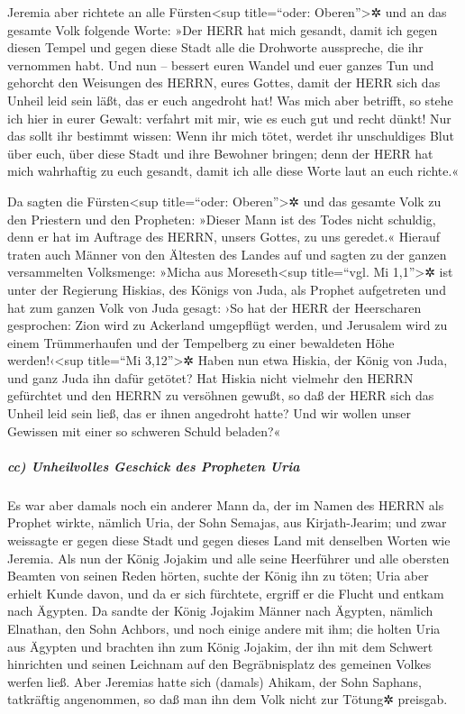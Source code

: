 Jeremia aber richtete an alle Fürsten\textless sup
title=``oder: Oberen''\textgreater✲ und an das gesamte Volk folgende
Worte: »Der HERR hat mich gesandt, damit ich gegen diesen Tempel und
gegen diese Stadt alle die Drohworte ausspreche, die ihr vernommen habt.
Und nun -- bessert euren Wandel und euer ganzes Tun und
gehorcht den Weisungen des HERRN, eures Gottes, damit der HERR sich das
Unheil leid sein läßt, das er euch angedroht hat! Was
mich aber betrifft, so stehe ich hier in eurer Gewalt: verfahrt mit mir,
wie es euch gut und recht dünkt! Nur das sollt ihr
bestimmt wissen: Wenn ihr mich tötet, werdet ihr unschuldiges Blut über
euch, über diese Stadt und ihre Bewohner bringen; denn der HERR hat mich
wahrhaftig zu euch gesandt, damit ich alle diese Worte laut an euch
richte.«

Da sagten die Fürsten\textless sup title=``oder:
Oberen''\textgreater✲ und das gesamte Volk zu den Priestern und den
Propheten: »Dieser Mann ist des Todes nicht schuldig, denn er hat im
Auftrage des HERRN, unsers Gottes, zu uns geredet.«
Hierauf traten auch Männer von den Ältesten des Landes
auf und sagten zu der ganzen versammelten Volksmenge:
»Micha aus Moreseth\textless sup title=``vgl. Mi
1,1''\textgreater✲ ist unter der Regierung Hiskias, des Königs von Juda,
als Prophet aufgetreten und hat zum ganzen Volk von Juda gesagt: ›So hat
der HERR der Heerscharen gesprochen: Zion wird zu Ackerland umgepflügt
werden, und Jerusalem wird zu einem Trümmerhaufen und der Tempelberg zu
einer bewaldeten Höhe werden!‹\textless sup title=``Mi
3,12''\textgreater✲ Haben nun etwa Hiskia, der König von
Juda, und ganz Juda ihn dafür getötet? Hat Hiskia nicht vielmehr den
HERRN gefürchtet und den HERRN zu versöhnen gewußt, so daß der HERR sich
das Unheil leid sein ließ, das er ihnen angedroht hatte? Und wir wollen
unser Gewissen mit einer so schweren Schuld beladen?«

\hypertarget{cc-unheilvolles-geschick-des-propheten-uria}{%
\subparagraph{cc) Unheilvolles Geschick des Propheten
Uria}\label{cc-unheilvolles-geschick-des-propheten-uria}}

Es war aber damals noch ein anderer Mann da, der im Namen
des HERRN als Prophet wirkte, nämlich Uria, der Sohn Semajas, aus
Kirjath-Jearim; und zwar weissagte er gegen diese Stadt und gegen dieses
Land mit denselben Worten wie Jeremia. Als nun der König
Jojakim und alle seine Heerführer und alle obersten Beamten von seinen
Reden hörten, suchte der König ihn zu töten; Uria aber erhielt Kunde
davon, und da er sich fürchtete, ergriff er die Flucht und entkam nach
Ägypten. Da sandte der König Jojakim Männer nach Ägypten,
nämlich Elnathan, den Sohn Achbors, und noch einige andere mit ihm;
die holten Uria aus Ägypten und brachten ihn zum König
Jojakim, der ihn mit dem Schwert hinrichten und seinen Leichnam auf den
Begräbnisplatz des gemeinen Volkes werfen ließ. Aber
Jeremias hatte sich (damals) Ahikam, der Sohn Saphans, tatkräftig
angenommen, so daß man ihn dem Volk nicht zur Tötung✲ preisgab.


